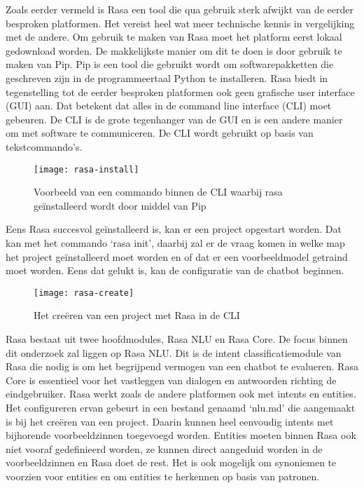 Zoals eerder vermeld is Rasa een tool die qua gebruik sterk afwijkt van de eerder besproken platformen. Het vereist heel wat meer technische kennis in vergelijking met de andere. Om gebruik te maken van Rasa moet het platform eerst lokaal gedownload worden. De makkelijkste manier om dit te doen is door gebruik te maken van Pip. Pip is een tool die gebruikt wordt om softwarepakketten die geschreven zijn in de programmeertaal Python te installeren. Rasa biedt in tegenstelling tot de eerder besproken platformen ook geen grafische user interface (GUI) aan. Dat betekent dat alles in de command line interface (CLI) moet gebeuren. De CLI is de grote tegenhanger van de GUI en is een andere manier om met software te communiceren. De CLI wordt gebruikt op basis van tekstcommando's.

\begin{figure}[H]
    \label{fig:rasa-install}
    \centering
    \texttt{[image: rasa-install]}
    \caption{Voorbeeld van een commando binnen de CLI waarbij rasa geïnstalleerd wordt door middel van Pip}
\end{figure}

Eens Rasa succesvol geïnstalleerd is, kan er een project opgestart worden. Dat kan met het commando ‘rasa init’, daarbij zal er de vraag komen in welke map het project geïnstalleerd moet worden en of dat er een voorbeeldmodel getraind moet worden. Eens dat gelukt is, kan de configuratie van de chatbot beginnen.

\begin{figure}[H]
    \label{fig:rasa-create}
    \centering
    \texttt{[image: rasa-create]}
    \caption{Het creëren van een project met Rasa in de CLI}
\end{figure}

Rasa bestaat uit twee hoofdmodules, Rasa NLU en Rasa Core. De focus binnen dit onderzoek zal liggen op Rasa NLU. Dit is de intent classificatiemodule van Rasa die nodig is om het begrijpend vermogen van een chatbot te evalueren. Rasa Core is essentieel voor het vastleggen van dialogen en antwoorden richting de eindgebruiker. Rasa werkt zoals de andere platformen ook met intents en entities. Het configureren ervan gebeurt in een bestand genaamd ‘nlu.md’ die aangemaakt is bij het creëren van een project. Daarin kunnen heel eenvoudig intents met bijhorende voorbeeldzinnen toegevoegd worden. Entities moeten binnen Rasa ook niet vooraf gedefinieerd worden, ze kunnen direct aangeduid worden in de voorbeeldzinnen en Rasa doet de rest. Het is ook mogelijk om synoniemen te voorzien voor entities en om entities te herkennen op basis van patronen.

